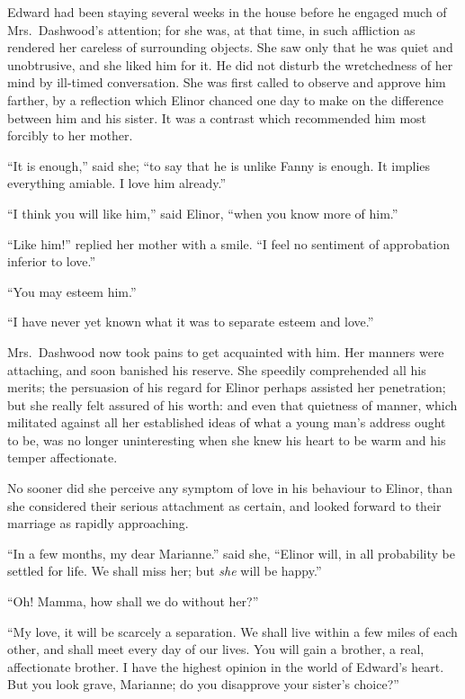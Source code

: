 \documentclass{article}
\begin{document}
Edward had been staying several weeks in the house
before he engaged much of Mrs.\ Dashwood's attention;
for she was, at that time, in such affliction as rendered
her careless of surrounding objects.  She saw only that he
was quiet and unobtrusive, and she liked him for it.
He did not disturb the wretchedness of her mind by
ill-timed conversation.  She was first called to observe
and approve him farther, by a reflection which Elinor
chanced one day to make on the difference between him
and his sister.  It was a contrast which recommended him
most forcibly to her mother.

``It is enough,'' said she; ``to say that he is unlike
Fanny is enough.  It implies everything amiable.
I love him already.''

``I think you will like him,'' said Elinor, ``when you
know more of him.''

``Like him!'' replied her mother with a smile.
``I feel no sentiment of approbation inferior to love.''

``You may esteem him.''

``I have never yet known what it was to separate
esteem and love.''

Mrs.\ Dashwood now took pains to get acquainted with him.
Her manners were attaching, and soon banished his reserve.
She speedily comprehended all his merits; the persuasion
of his regard for Elinor perhaps assisted her penetration;
but she really felt assured of his worth: and even that
quietness of manner, which militated against all her
established ideas of what a young man's address ought to be,
was no longer uninteresting when she knew his heart to be
warm and his temper affectionate.

No sooner did she perceive any symptom of love
in his behaviour to Elinor, than she considered their
serious attachment as certain, and looked forward
to their marriage as rapidly approaching.

``In a few months, my dear Marianne.'' said she,
``Elinor will, in all probability be settled for life.
We shall miss her; but \emph{she} will be happy.''

``Oh! Mamma, how shall we do without her?''

``My love, it will be scarcely a separation.
We shall live within a few miles of each other, and shall
meet every day of our lives.  You will gain a brother,
a real, affectionate brother.  I have the highest opinion
in the world of Edward's heart.  But you look grave,
Marianne; do you disapprove your sister's choice?''
\end{document}
